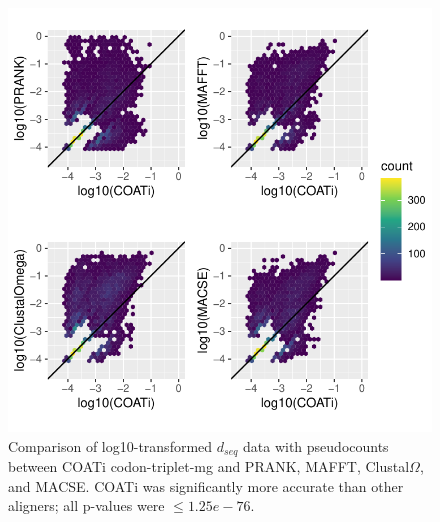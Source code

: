\newpage

\begin{figure}[!ht]
    \centering
    \includegraphics{chapter2/appendix-figures/dseq_plots_tri-mg.pdf}
    \caption[$d_{seq}$ Triplet-MG94]{Comparison of log10-transformed $d_{seq}$ data with pseudocounts between COATi codon-triplet-mg and PRANK, MAFFT, Clustal$\Omega$, and MACSE. COATi was significantly more accurate than other aligners; all p-values were $\leq 1.25e-76$.}
    \label{fig:dseq-tri-mg}
\end{figure}

